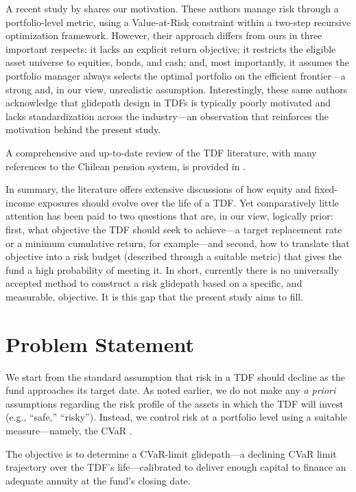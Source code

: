 \documentclass[11pt]{article}
\begin{document}
A recent study by \citet{perchet2025} shares
our motivation.  These authors manage risk through a portfolio-level metric,
using a Value-at-Risk constraint within a two-step recursive optimization
framework. However, their approach differs from ours in three important
respects: it lacks an explicit return objective; 
it restricts the eligible asset universe to equities, bonds, and cash; and,
most importantly, it assumes the portfolio manager always selects the
optimal portfolio on the efficient frontier---a strong and, in our view,
unrealistic assumption. Interestingly, these same authors acknowledge that
glidepath design in TDFs is typically poorly motivated and lacks standardization
across the industry---an observation that reinforces the motivation behind
the present study.



A comprehensive and up-to-date review of the TDF literature, with many references to the Chilean pension system,  is provided in \cite{suarez2025}.

In summary, the literature offers extensive discussions of how equity 
and fixed-income exposures should evolve over the life of a TDF. 
Yet comparatively little attention has been paid to two questions 
that are, in our view, logically prior: first, what objective the 
TDF should seek to achieve---a target replacement rate or a minimum 
cumulative return, for example---and second, how to translate that 
objective into a risk budget (described  through a suitable metric) that gives the fund a high probability 
of meeting it.   In short, currently there is no universally accepted method to construct a risk glidepath based on a specific, and measurable, objective. It is this gap that the present study aims to fill.


\section{Problem Statement}

We start from the standard assumption that risk in a TDF should decline as the fund approaches its target date. As noted earlier, we do not make any \emph{a priori} assumptions regarding the risk profile of the assets in which the TDF will invest (e.g., ``safe,'' ``risky''). Instead, we control risk at a portfolio level using a suitable measure---namely, the CVaR \cite{rockafellar2000}.

The objective is to determine a CVaR-limit glidepath---a  declining CVaR limit trajectory over the TDF's life---calibrated to deliver enough capital to finance an adequate annuity at the fund's closing date.
\end{document}
